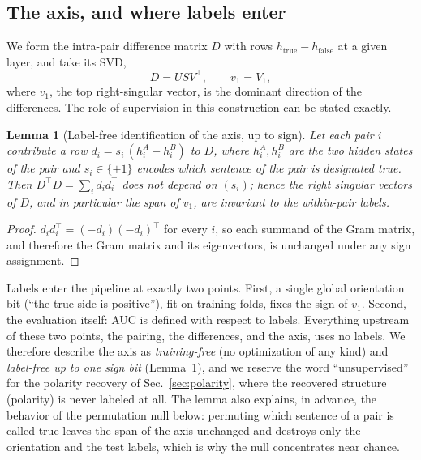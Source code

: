 \documentclass[11pt]{article}
\newtheorem{lemma}{Lemma}
\begin{document}
\subsection{The axis, and where labels enter}
\label{sec:axis}

We form the intra-pair difference matrix $D$ with rows
$h_{\text{true}} - h_{\text{false}}$ at a given layer, and take its SVD,
\begin{equation}
D = U S V^{\top}, \qquad v_{1} = V_{1},
\end{equation}
where $v_1$, the top right-singular vector, is the dominant direction of the
differences. The role of supervision in this construction can be stated
exactly.

\begin{lemma}[Label-free identification of the axis, up to sign]
\label{lem:labels}
Let each pair $i$ contribute a row $d_i = s_i\,(h_i^{A} - h_i^{B})$ to $D$,
where $h_i^{A}, h_i^{B}$ are the two hidden states of the pair and
$s_i \in \{\pm 1\}$ encodes which sentence of the pair is designated true.
Then $D^{\top} D = \sum_i d_i d_i^{\top}$ does not depend on $(s_i)$; hence
the right singular vectors of $D$, and in particular the span of $v_1$, are
invariant to the within-pair labels.
\end{lemma}

\begin{proof}
$d_i d_i^{\top} = (-d_i)(-d_i)^{\top}$ for every $i$, so each summand of the
Gram matrix, and therefore the Gram matrix and its eigenvectors, is unchanged
under any sign assignment.
\end{proof}

Labels enter the pipeline at exactly two points. First, a single global
orientation bit (``the true side is positive''), fit on training folds,
fixes the sign of $v_1$. Second, the evaluation itself: AUC is defined with
respect to labels. Everything upstream of these two points, the pairing, the
differences, and the axis, uses no labels. We therefore describe the axis as
\emph{training-free} (no optimization of any kind) and \emph{label-free up to
one sign bit} (Lemma~\ref{lem:labels}), and we reserve the word
``unsupervised'' for the polarity recovery of Sec.~\ref{sec:polarity}, where
the recovered structure (polarity) is never labeled at all. The lemma also
explains, in advance, the behavior of the permutation null below: permuting
which sentence of a pair is called true leaves the span of the axis
unchanged and destroys only the orientation and the test labels, which is why
the null concentrates near chance.
\end{document}
